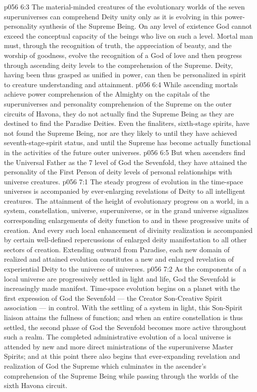 \vs p056 6:3 \pc The material\hyp{}minded creatures of the evolutionary worlds of the seven superuniverses can comprehend Deity unity only as it is evolving in this power\hyp{}personality synthesis of the Supreme Being. On any level of existence God cannot exceed the conceptual capacity of the beings who live on such a level. Mortal man must, through the recognition of truth, the appreciation of beauty, and the worship of goodness, evolve the recognition of a God of love and then progress through ascending deity levels to the comprehension of the Supreme. Deity, having been thus grasped as unified in power, can then be personalized in spirit to creature understanding and attainment.
\vs p056 6:4 While ascending mortals achieve power comprehension of the Almighty on the capitals of the superuniverses and personality comprehension of the Supreme on the outer circuits of Havona, they do not actually find the Supreme Being as they are destined to find the Paradise Deities. Even the finaliters, sixth\hyp{}stage spirits, have not found the Supreme Being, nor are they likely to until they have achieved seventh\hyp{}stage\hyp{}spirit status, and until the Supreme has become actually functional in the activities of the future outer universes.
\vs p056 6:5 But when ascenders find the Universal Father as the 7 level of God the Sevenfold, they have attained the personality of the First Person of  deity levels of personal relationships with universe creatures.
\vs p056 7:1 The steady progress of evolution in the time\hyp{}space universes is accompanied by ever\hyp{}enlarging revelations of Deity to all intelligent creatures. The attainment of the height of evolutionary progress on a world, in a system, constellation, universe, superuniverse, or in the grand universe signalizes corresponding enlargements of deity function to and in these progressive units of creation. And every such local enhancement of divinity realization is accompanied by certain well\hyp{}defined repercussions of enlarged deity manifestation to all other sectors of creation. Extending outward from Paradise, each new domain of realized and attained evolution constitutes a new and enlarged revelation of experiential Deity to the universe of universes.
\vs p056 7:2 As the components of a local universe are progressively settled in light and life, God the Sevenfold is increasingly made manifest. Time\hyp{}space evolution begins on a planet with the first expression of God the Sevenfold --- the Creator Son\hyp{}Creative Spirit association --- in control. With the settling of a system in light, this Son\hyp{}Spirit liaison attains the fullness of function; and when an entire constellation is thus settled, the second phase of God the Sevenfold becomes more active throughout such a realm. The completed administrative evolution of a local universe is attended by new and more direct ministrations of the superuniverse Master Spirits; and at this point there also begins that ever\hyp{}expanding revelation and realization of God the Supreme which culminates in the ascender’s comprehension of the Supreme Being while passing through the worlds of the sixth Havona circuit.
